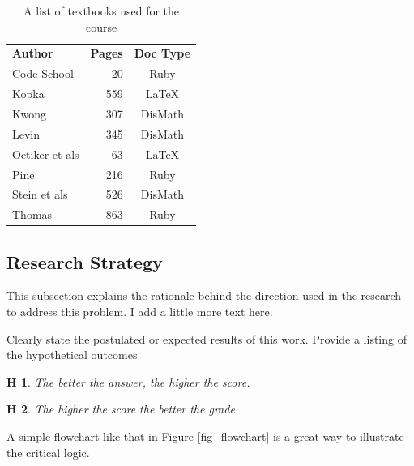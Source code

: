 \documentclass[journal,12pt]{IEEEtran}
\newtheorem{hyp}{H}
\begin{document}
\begin{table}[htb]
\caption{A list of textbooks used for the course}
\label{textbookList}
\medskip
\centering
\small
\begin{tabular}{p{1.25in}rc}
\textbf{Author} & \textbf{Pages} & \textbf{Doc Type}\\
Code School\cite{CodeSchool:2013} & 20 & Ruby\\
Kopka\cite{Kopka:2003} & 559 & \LaTeX \\
Kwong\cite{Kwong:2015} & 307 & DisMath\\
Levin\cite{Levin:2017} & 345 & DisMath\\
Oetiker et als\cite{Oetiker:1996} & 63 & \LaTeX\\
Pine\cite{Pine:2014} & 216 & Ruby \\
Stein et als\cite{Stein:2011} & 526 & DisMath\\
Thomas\cite{Thomas:2013} & 863 & Ruby \\
\end{tabular}
\end{table}


\subsection{Research Strategy}
This subsection explains the rationale behind the direction used in the research to address this problem. I add a little more text here.

Clearly state the postulated or expected results of this work. Provide a listing of the hypothetical outcomes.

\begin{hyp}
The better the answer, the higher the score.
\end{hyp}

\begin{hyp}
The higher the score the better the grade
\end{hyp} 



A simple flowchart like that in Figure \ref{fig_flowchart} is a great way to illustrate the critical logic.
\end{document}
